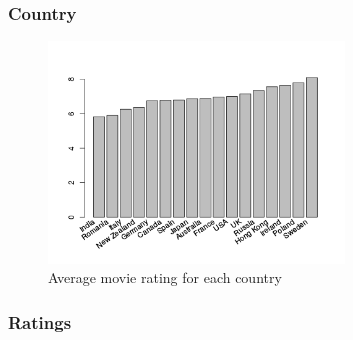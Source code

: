 \newpage
\subsubsection{Country}
\label{subs:Country}

\begin{figure}[!h]
\begin{center}
\includegraphics[width=0.70\textwidth]{../src/pre-processing/stats/results/rateByCountry.png}
\end{center}
\caption{Average movie rating for each country}
\label{fig:rateByCountry}
\end{figure}


\newpage
\subsubsection{Ratings}
\label{subs:Ratings}

